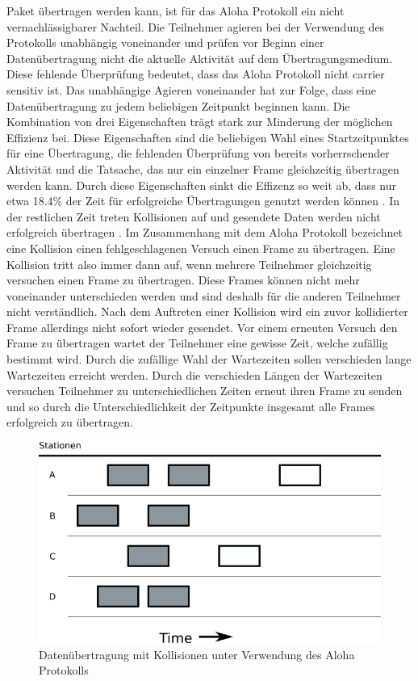Paket übertragen werden kann, ist für das Aloha Protokoll ein nicht vernachlässigbarer Nachteil. Die Teilnehmer agieren bei der Verwendung des Protokolls unabhängig voneinander und prüfen vor Beginn einer Datenübertragung nicht die aktuelle Aktivität auf dem Übertragungsmedium. Diese fehlende Überprüfung bedeutet, dass das Aloha Protokoll nicht carrier sensitiv ist. Das unabhängige Agieren voneinander hat zur Folge, dass eine Datenübertragung zu jedem beliebigen Zeitpunkt beginnen kann. Die Kombination von drei Eigenschaften trägt stark zur Minderung der möglichen Effizienz bei. Diese Eigenschaften sind die beliebigen Wahl eines Startzeitpunktes für eine Übertragung, die fehlenden Überprüfung von bereits vorherrschender Aktivität und die Tatsache, das nur ein einzelner Frame gleichzeitig übertragen werden kann. Durch diese Eigenschaften sinkt die Effizenz so weit ab, dass nur etwa 18.4\% der Zeit für erfolgreiche Übertragungen genutzt werden können \cite{Back_AlohaPure}. In der restlichen Zeit treten Kollisionen auf und gesendete Daten werden nicht erfolgreich übertragen \cite{Back_AlohaPure}. Im Zusammenhang mit dem Aloha Protokoll bezeichnet eine Kollision einen fehlgeschlagenen Versuch einen Frame zu übertragen. Eine Kollision tritt also immer dann auf, wenn mehrere Teilnehmer gleichzeitig versuchen einen Frame zu übertragen. Diese Frames können nicht mehr voneinander unterschieden werden und sind deshalb für die anderen Teilnehmer nicht verständlich. Nach dem Auftreten einer Kollision wird ein zuvor kollidierter Frame allerdings nicht sofort wieder gesendet. Vor einem erneuten Versuch den Frame zu übertragen wartet der Teilnehmer eine gewisse Zeit, welche zufällig bestimmt wird. Durch die zufällige Wahl der Wartezeiten sollen verschieden lange Wartezeiten erreicht werden. Durch die verschieden Längen der Wartezeiten versuchen Teilnehmer zu unterschiedlichen Zeiten erneut ihren Frame zu senden und so durch die Unterschiedlichkeit der Zeitpunkte insgesamt alle Frames erfolgreich zu übertragen.
\begin{figure}[h!]
	\centering
	\includegraphics[scale=0.6]{img/ZeichnungExport2.png}
	\caption{Datenübertragung mit Kollisionen unter Verwendung des Aloha Protokolls}
	\label{Abb2_PureAloha}
\end{figure}

